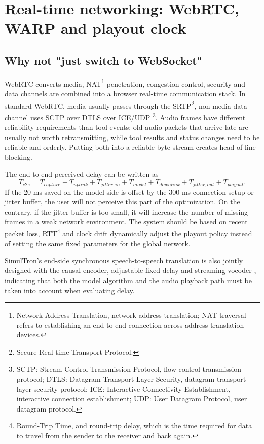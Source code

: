 \documentclass[UTF8,fontset=none,a4paper,10pt]{ctexart}
\begin{document}
\section{Real-time networking: WebRTC, WARP and playout clock}

\subsection{Why not "just switch to WebSocket"}

WebRTC converts media, NAT\footnote{Network Address Translation, network address translation; NAT traversal refers to establishing an end-to-end connection across address translation devices. } penetration, congestion control, security and data channels are combined into a browser real-time communication stack. In standard WebRTC, media usually passes through the SRTP\footnote{Secure Real-time Transport Protocol. }, non-media data channel uses SCTP over DTLS over ICE/UDP \footnote{SCTP: Stream Control Transmission Protocol, flow control transmission protocol; DTLS: Datagram Transport Layer Security, datagram transport layer security protocol; ICE: Interactive Connectivity Establishment, interactive connection establishment; UDP: User Datagram Protocol, user datagram protocol. }\cite{en:alvestrand2021webrtc,en:jesup2021datachannels}. Audio frames have different reliability requirements than tool events: old audio packets that arrive late are usually not worth retransmitting, while tool results and status changes need to be reliable and orderly. Putting both into a reliable byte stream creates head-of-line blocking.

The end-to-end perceived delay can be written as
\begin{equation}
T_{e2e}=T_{capture}+T_{uplink}+T_{jitter,in}+T_{model}+T_{downlink}+T_{jitter,out}+T_{playout}.
\end{equation}
If the 20 ms saved on the model side is offset by the 300 ms connection setup or jitter buffer, the user will not perceive this part of the optimization. On the contrary, if the jitter buffer is too small, it will increase the number of missing frames in a weak network environment. The system should be based on recent packet loss, RTT\footnote{Round-Trip Time, and round-trip delay, which is the time required for data to travel from the sender to the receiver and back again. } and clock drift dynamically adjust the playout policy instead of setting the same fixed parameters for the global network.

SimulTron's end-side synchronous speech-to-speech translation is also jointly designed with the causal encoder, adjustable fixed delay and streaming vocoder \cite{en:agranovich2024simultron}, indicating that both the model algorithm and the audio playback path must be taken into account when evaluating delay.
\end{document}
